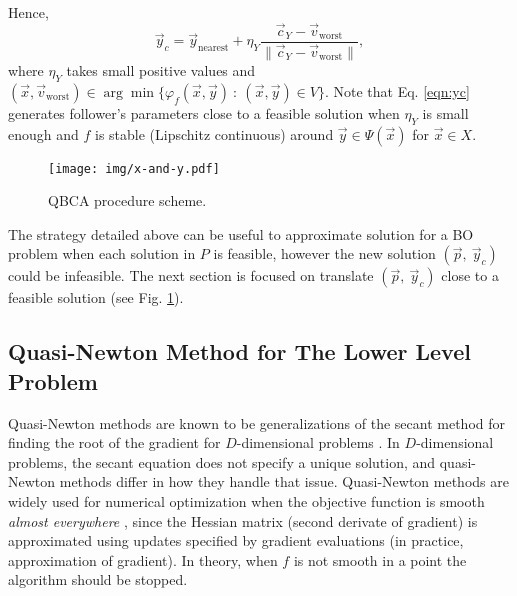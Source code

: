 \documentclass[conference]{IEEEtran}
\theoremstyle{definition}
\begin{document}
Hence,
\begin{equation}
    \vec{y}_c = \vec{y}_{\text{nearest}} + \eta_{Y} \dfrac{\vec{c}_Y - \vec{v}_{\text{worst}}}{\| \vec{c}_Y - \vec{v}_{\text{worst}} \|},
    \label{eqn:yc}
\end{equation} %
% 
where $\eta_Y$ takes small positive values and 
% 
$
    (\vec{x}, \vec{v}_{\text{worst}}) \in \arg \min \{\varphi_f(\vec{x}, \vec{y} )  \ : \ (\vec{x}, \vec{y}) \in V \}
$. Note that Eq. \ref{eqn:yc} generates follower's parameters close to a feasible
solution when $\eta_{Y}$ is small enough and $f$ is stable (Lipschitz continuous)
around $\vec{y} \in \Psi(\vec{x}) $ for  $\vec{x} \in X$. %
% 

% 
\begin{figure}[!ht]
    \centering
    \texttt{[image: img/x-and-y.pdf]}
    \caption{QBCA procedure scheme.}
    \label{fig:qca}
\end{figure}
% 
The strategy detailed above can be useful to approximate solution for a BO problem
when each solution in  $P$ is feasible, however the new solution $(\vec{p},\ \vec{y}_c)$
could be infeasible. The next section is focused on translate $(\vec{p},\ \vec{y}_c)$
close to a feasible solution (see Fig. \ref{fig:qca}).


\subsection{Quasi-Newton Method for The Lower Level Problem} %
\label{sub:nonsmooth_optimization_via_bfgs}

Quasi-Newton methods are known to be generalizations of the secant method for
finding the root of the gradient for $D$-dimensional problems \cite{fletcher2013practical,liu1989limited}.
In $D$-dimensional problems, the secant equation does not specify a unique solution,
and quasi-Newton methods differ in how they handle that issue. Quasi-Newton methods
are widely used for numerical optimization when the objective function is smooth
\textit{almost everywhere} \cite{lewis2013nonsmooth}, since the Hessian matrix
(second derivate of gradient) is approximated using updates specified by gradient
evaluations (in practice, approximation of gradient). In theory, when $f$ is not
smooth in a point the algorithm should be stopped. 
\end{document}
